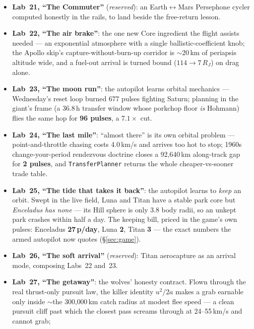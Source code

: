 \documentclass[10pt,twocolumn]{article}
\begin{document}
\begin{itemize}
  \item \textbf{Lab~21, ``The Commuter''} (\emph{reserved}): an Earth$\leftrightarrow$Mars
        Persephone cycler computed honestly in the rails, to land beside the free-return
        lesson.
  \item \textbf{Lab~22, ``The air brake''}: the one new Core ingredient the flight assists
        needed --- an exponential atmosphere with a single ballistic-coefficient knob; the
        Apollo skip's capture-without-burn-up corridor is $\sim$20\,km of periapsis altitude
        wide, and a fuel-out arrival is turned bound ($114\!\to\!7\,R_J$) on drag alone.
  \item \textbf{Lab~23, ``The moon run''}: the autopilot learns orbital mechanics ---
        Wednesday's reset loop burned 677 pulses fighting Saturn; planning in the giant's
        frame (a 36.8\,h transfer window whose porkchop floor \emph{is} Hohmann) flies the
        same hop for \textbf{96 pulses}, a $7.1\times$ cut.
  \item \textbf{Lab~24, ``The last mile''}: ``almost there'' is its own orbital problem ---
        point-and-throttle chasing costs 4.0\,km/s and arrives too hot to stop; 1960s
        change-your-period rendezvous doctrine closes a 92{,}640\,km along-track gap for
        \textbf{2 pulses}, and \texttt{TransferPlanner} returns the whole cheaper-vs-sooner
        trade table.
  \item \textbf{Lab~25, ``The tide that takes it back''}: the autopilot learns to
        \emph{keep} an orbit. Swept in the live field, Luna and Titan have a stable park
        core but \emph{Enceladus has none} --- its Hill sphere is only 3.8 body radii, so an
        unkept park crashes within half a day. The keeping bill, priced in the game's own
        pulses: Enceladus \textbf{27\,p/day}, Luna \textbf{2}, Titan \textbf{3} --- the
        exact numbers the armed autopilot now quotes (\S\ref{sec:game}).
  \item \textbf{Lab~26, ``The soft arrival''} (\emph{reserved}): Titan aerocapture as an
        arrival mode, composing Labs~22 and~23.
  \item \textbf{Lab~27, ``The getaway''}: the wolves' honesty contract. Flown through the
        real thrust-only pursuit law, the killer identity $u^2/2a$ makes a grab earnable only
        inside $\sim$the 300{,}000\,km catch radius at modest flee speed --- a clean pursuit
        cliff past which the closest pass screams through at 24--55\,km/s and cannot grab;

\end{itemize}
\end{document}
